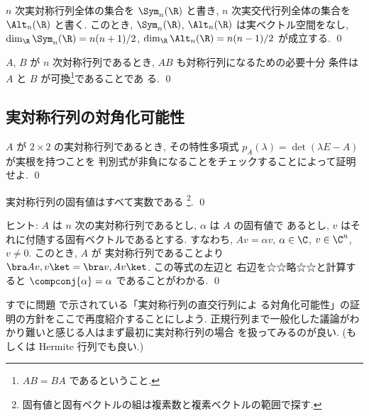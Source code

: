 \documentclass[12pt,twoside]{jarticle}
\begin{document}

\begin{question}
  $n$ 次実対称行列全体の集合を $\Sym_n(\R)$ と書き,
  $n$ 次実交代行列全体の集合を $\Alt_n(\R)$ と書く.
  このとき, $\Sym_n(\R)$, $\Alt_n(\R)$ は実ベクトル空間をなし,
  $\dim_\R\Sym_n(\R)=n(n+1)/2$, $\dim_\R\Alt_n(\R)=n(n-1)/2$ が成立する. 
  \qed
\end{question}


\begin{question}
  $A$, $B$ が $n$ 次対称行列であるとき, $AB$ も対称行列になるための必要十分
  条件は $A$ と $B$ が可換\footnote{$AB=BA$ であるということ.}であることであ
  る.  \qed
\end{question}


\subsection{実対称行列の対角化可能性}

\begin{question}
  $A$ が $2\times 2$ の実対称行列であるとき,
  その特性多項式 $p_A(\lambda)=\det(\lambda E - A)$ が実根を持つことを
  判別式が非負になることをチェックすることによって証明せよ. \qed
\end{question}


\begin{question}
  実対称行列の固有値はすべて実数である%
  \footnote{固有値と固有ベクトルの組は複素数と複素ベクトルの範囲で探す.}. 
  \qed
\end{question}

\noindent
ヒント: $A$ は $n$ 次の実対称行列であるとし, $\alpha$ は $A$ の固有値で
あるとし, $v$ はそれに付随する固有ベクトルであるとする.  すなわち,
$Av=\alpha v$, $\alpha\in\C$, $v\in\C^n$, $v\ne 0$.  このとき, $A$ が
実対称行列であることより $\bra Av,v\ket = \bra v,Av\ket$.  この等式の左辺と
右辺を☆☆略☆☆と計算すると $\compconj{\alpha}=\alpha$ であることがわかる.  
\qed

\bigskip

すでに問題  で示されている「実対称行列の直交行列によ
る対角化可能性」の証明の方針をここで再度紹介することにしよう.
正規行列まで一般化した議論がわかり難いと感じる人はまず最初に実対称行列の場合
を扱ってみるのが良い.  (もしくは Hermite 行列でも良い.)
\end{document}
